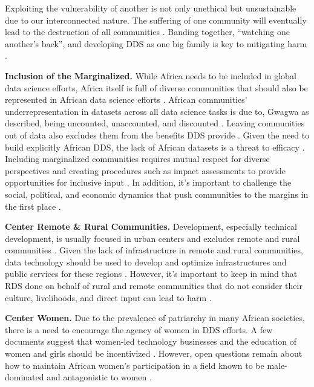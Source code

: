 Exploiting the vulnerability of another is not only unethical but unsustainable due to our interconnected nature. The suffering of one community will eventually lead to the destruction of all communities \cite{nwankwo2019africa}.  
Banding together, ``watching one another's back'', and developing DDS as one big family is key to mitigating harm \cite{olojede2023towards,nyerere1962ujamaa}. 

\textbf{Inclusion of the Marginalized.}
\label{sec:inclusion}
While Africa needs to be included in global data science efforts, Africa itself is full of diverse communities that should also be represented in African data science efforts \cite{adelani2022masakhaner,gwagwa2019recommendations,goffi2023teaching}. 
African communities' underrepresentation in datasets across all data science tasks is due to, Gwagwa as described, being uncounted, unaccounted, and discounted \cite{gwagwa2019recommendations}. Leaving communities out of data also excludes them from the benefits DDS provide \cite{gwagwa2022role}. Given the need to build explicitly African DDS, the lack of African datasets is a threat to efficacy \cite{okolo2023responsible,olojede2023towards, ade-ibijola2023artificial}.
Including marginalized communities requires mutual respect for diverse perspectives and creating procedures such as impact assessments to provide opportunities for inclusive input \cite{african_union2024continental, abebe2021narratives, goffi2023teaching, mhlambi2020from}. In addition, it’s important to challenge the social, political, and economic dynamics that push communities to the margins in the first place \cite{kiemde2022towards, olojede2023towards,segun2021critically,day2023data,uzomah2023african,abebe2021narratives}.
 
\textbf{Center Remote \& Rural Communities.}
Development, especially technical development, is usually focused in urban centers and excludes remote and rural communities \cite{ade-ibijola2023artificial, sinha2023principlesafrofeminist, osaghae2004rescuing}. Given the lack of infrastructure in remote and rural communities, data technology should be used to develop and optimize infrastructures and public services for these regions \cite{carman2023applying, african_union2024continental}. 
However, it’s important to keep in mind that RDS done on behalf of rural and remote communities that do not consider their culture, livelihoods, and direct input can lead to harm \cite{african_union2024continental, ndjungu2020blood, carman2023applying}.

\textbf{Center Women.}
\label{sec:center_women}
Due to the prevalence of patriarchy in many African societies, there is a need to encourage the agency of women in DDS efforts. A few documents suggest that women-led technology businesses and the education of women and girls should be incentivized \cite{african_union2024continental}. However, open questions remain about how to maintain African women's participation in a field known to be male-dominated and antagonistic to women \cite{african_union2024continental, gwagwa2019recommendations}. 

